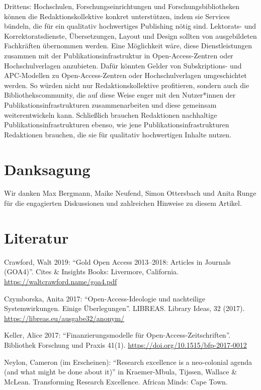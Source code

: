 \documentclass[a4paper,
fontsize=11pt,
oneside,
numbers=noperiodatend,
parskip=half-,
bibliography=totoc,
final
]{scrartcl}
\begin{document}
Drittens: Hochschulen, Forschungseinrichtungen und
Forschungsbibliotheken können die Redaktionskollektive konkret
unterstützen, indem sie Services bündeln, die für ein qualitativ
hochwertiges Publishing nötig sind. Lektorats- und Korrektoratsdienste,
Übersetzungen, Layout und Design sollten von ausgebildeten Fachkräften
übernommen werden. Eine Möglichkeit wäre, diese Dienstleistungen
zusammen mit der Publikationsinfrastruktur in Open-Access-Zentren oder
Hochschulverlagen anzubieten. Dafür könnten Gelder von Subskriptions-
und APC-Modellen zu Open-Access-Zentren oder Hochschulverlagen
umgeschichtet werden. So würden nicht nur Redaktionskollektive
profitieren, sondern auch die Bibliothekscommunity, die auf diese Weise
enger mit den Nutzer*innen der Publikationsinfrastrukturen
zusammenarbeiten und diese gemeinsam weiterentwickeln kann. Schließlich
brauchen Redaktionen nachhaltige Publikationsinfrastrukturen ebenso, wie
jene Publikationsinfrastrukturen Redaktionen brauchen, die sie für
qualitativ hochwertigen Inhalte nutzen.

\hypertarget{danksagung}{%
\section{Danksagung}\label{danksagung}}

Wir danken Max Bergmann, Maike Neufend, Simon Ottersbach und Anita Runge
für die engagierten Diskussionen und zahlreichen Hinweise zu diesem
Artikel.

\hypertarget{literatur}{%
\section{Literatur}\label{literatur}}

Crawford, Walt 2019: \enquote{Gold Open Access 2013--2018: Articles in
Journals (GOA4)}. Cites \& Insights Books: Livermore, California.
\url{https://waltcrawford.name/goa4.pdf}

Czymborska, Anita 2017: \enquote{Open-Access-Ideologie und nachteilige
Systemwirkungen. Einige Überlegungen}. LIBREAS. Library Ideas, 32
(2017). \url{https://libreas.eu/ausgabe32/anonym/}

Keller, Alice 2017: \enquote{Finanzierungsmodelle für
Open-Access-Zeitschriften}. Bibliothek Forschung und Praxis 41(1).
\url{https://doi.org/10.1515/bfp-2017-0012}

Neylon, Cameron (im Erscheinen): \enquote{Research excellence is a
neo-colonial agenda (and what might be done about it)} in Kraemer-Mbula,
Tijssen, Wallace \& McLean. Transforming Research Excellence. African
Minds: Cape Town.
\end{document}
